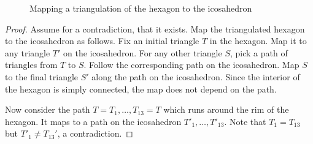 
\begin{figure}[htb]
  \centering
  \caption{Mapping a triangulation of the hexagon to
the icosahedron}
  \label{fig:th:A}
\end{figure}

\begin{proof}  Assume for a contradiction, that it exists.  Map
the triangulated hexagon to the icosahedron as follows.  Fix an
initial triangle $T$ in the hexagon.  Map it to any triangle $T'$
on the icosahedron.  For any other triangle $S$, pick a path of
triangles from $T$ to $S$.  Follow the corresponding path on the
icosahedron.  Map $S$ to the final triangle $S'$ along the path on
the icosahedron.  Since the interior of the hexagon is simply connected,
the map does not depend on the path.

%
%
%
Now consider the path $T=T_1,\ldots,T_{13}=T$ which runs around
the rim of the hexagon.  It  maps to a path on the
icosahedron $T'_1,\ldots,T'_{13}$.  Note that $T_1=T_{13}$ but
$T'_1\ne T_{13}'$, a contradiction.
\end{proof}

